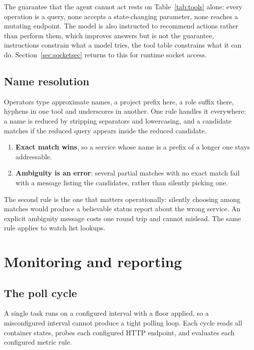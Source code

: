 \documentclass[11pt,a4paper]{article}
\let\stdsection\section
\renewcommand{\section}{\clearpage\stdsection}
\begin{document}
The guarantee that the agent cannot act rests on Table~\ref{tab:tools} alone: every
operation is a query, none accepts a state-changing parameter, none reaches a
mutating endpoint. The model is also instructed to recommend actions rather than
perform them, which improves answers but is not the guarantee, instructions
constrain what a model tries, the tool table constrains what it can do.
Section~\ref{sec:socketsec} returns to this for runtime socket access.

\subsection{Name resolution}
\label{sec:names}

Operators type approximate names, a project prefix here, a role suffix there, hyphens
in one tool and underscores in another. One rule handles it everywhere: a name is
reduced by stripping separators and lowercasing, and a candidate matches if the
reduced query appears inside the reduced candidate.

\begin{enumerate}
  \item \textbf{Exact match wins}, so a service whose name is a prefix of a longer
        one stays addressable.
  \item \textbf{Ambiguity is an error}: several partial matches with no exact match
        fail with a message listing the candidates, rather than silently picking
        one.
\end{enumerate}

The second rule is the one that matters operationally: silently choosing among
matches would produce a believable status report about the wrong service. An
explicit ambiguity message costs one round trip and cannot mislead. The same rule
applies to watch list lookups.

\section{Monitoring and reporting}

\subsection{The poll cycle}

A single task runs on a configured interval with a floor applied, so a misconfigured
interval cannot produce a tight polling loop. Each cycle reads all container states,
probes each configured HTTP endpoint, and evaluates each configured metric rule.
\end{document}

